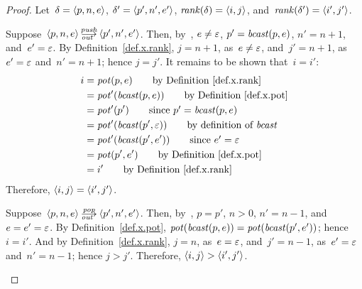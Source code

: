 
\lemxrankout*
\begin{proof}\strut
  Let~$\delta=\<p,n,e>$, $\delta'=\<p',n',e'>$,
  $\rank(\delta)=\<i,j>$, and~$\rank(\delta')=\<i',j'>$.
  \begin{enumerate:a}
  \item Suppose~$\<p,n,e>\outpush\<p',n',e'>$.  Then, by~,
    $e\ne\varepsilon$, $p'=\operatorname{\mathit{bcast}}(p,e)$, $n'=n+1$, and~$e'=\varepsilon$.  By
    Definition~\ref{def.x.rank}, $j=n+1$, as~$e\ne\varepsilon$, and~$j'=n+1$,
    as~$e'=\varepsilon$ and~$n'=n+1$; hence $j=j'$.
    It remains to be shown that~$i=i'$:
    \begin{align*}
      i&=\pot(p,e)
         \tag*{by Definition~\ref{def.x.rank}}\\
       &=\pot'(\bcast(p,e))
         \tag*{by Definition~\ref{def.x.pot}}\\
       &=\pot'(p')
         \tag*{since~$p'=\bcast(p,e)$}\\
       &=\pot'(\bcast(p',\nil))
         \tag*{by definition of~$\bcast$}\\
       &=\pot'(\bcast(p',e'))
         \tag*{since~$e'=\nil$}\\
       &=\pot(p',e')
         \tag*{by Definition~\ref{def.x.pot}}\\
       &=i'
         \tag*{by Definition~\ref{def.x.rank}}
    \end{align*}
    Therefore, $\<i,j>=\<i',j'>$.

  \item Suppose~$\<p,n,e>\outpop\<p',n',e'>$.  Then, by~, $p=p'$,
    $n>0$, $n'=n-1$, and~$e=e'=\varepsilon$.
    By Definition~\ref{def.x.pot}, $\operatorname{\mathit{pot}}(\operatorname{\mathit{bcast}}(p,e))=\operatorname{\mathit{pot}}(\operatorname{\mathit{bcast}}(p',e'))$;
    hence $i=i'$.  And by Definition~\ref{def.x.rank}, $j=n$, as~$e=\varepsilon$,
    and~$j'=n-1$, as~$e'=\varepsilon$ and~$n'=n-1$; hence $j>j'$.
    Therefore, ${\<i,j>}>{\<i',j'>}$.\qedhere
  \end{enumerate:a}
\end{proof}

